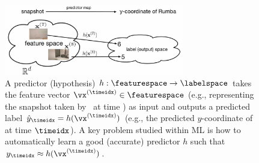 \documentclass[12pt]{report}
\begin{document}
\begin{figure}[htbp]
    \centering
    \includegraphics[width=0.7\textwidth]{HypothesisMapRumba.jpg}  
    \caption{A predictor (hypothesis) $h: \featurespace \rightarrow \labelspace$ takes 
    	the feature vector $\vx^{(\timeidx)} \in \featurespace$  (e.g., representing the 
    	snapshot taken by \rumba\, at time \timeidx) as input and outputs a predicted 
    	label $\hat{y}_{\timeidx}=h(\vx^{(\timeidx)} )$ (e.g., the predicted $y$-coordinate 
    	of \rumba\, at time $\timeidx$). A key problem studied within ML is how to 
    	automatically learn a good (accurate) predictor $h$ such that $y_{\timeidx} \approx h(\vx^{(\timeidx)} )$. }
\label{fig:Hypothesis Map}
\end{figure}

\end{document}
